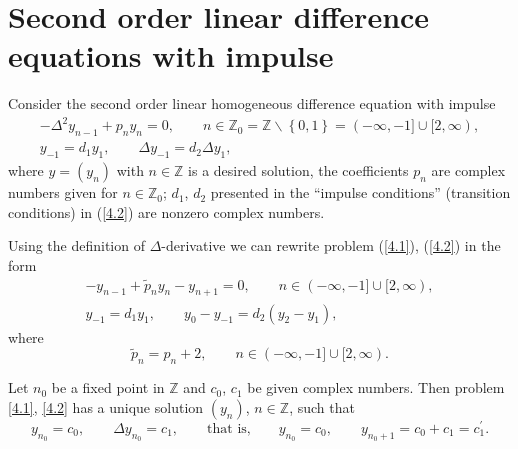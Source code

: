 \documentclass[pdftex]{sigma}
\numberwithin{equation}{section}
\begin{document}
\section[Second order linear difference equations with impulse]{Second order linear dif\/ference equations with impulse}\label{section4}

Consider the second order linear homogeneous dif\/ference equation with impulse%
\begin{gather}
-\Delta ^{2}y_{n-1}+p_{n}y_{n}=0,\qquad n\in \mathbb{Z}_{0}=%
\mathbb{Z}
\backslash \left\{ 0,1\right\} =(-\infty ,-1]\cup \lbrack 2,\infty ),
\label{4.1}
\\
y_{-1}=d_{1}y_{1},\qquad \Delta y_{-1}=d_{2}\Delta y_{1},  \label{4.2}
\end{gather}%
where $y=\left( y_{n}\right) $ with $n\in \mathbb{Z}
$ is a desired solution, the coef\/f\/icients $p_{n}$ are complex numbers given
for $n\in
\mathbb{Z}
_{0}$; $d_{1}$, $d_{2}$ presented in the ``impulse conditions'' (transition
conditions) in (\ref{4.2}) are nonzero complex numbers.

Using the def\/inition of $\Delta $-derivative we can rewrite problem (\ref{4.1}), (\ref{4.2}) in the form%
\begin{gather}
-y_{n-1}+\widetilde{p}_{n}y_{n}-y_{n+1}=0,\qquad n\in (-\infty ,-1]\cup
\lbrack 2,\infty ),  \label{4.3}
\\
y_{-1}=d_{1}y_{1},\qquad y_{0}-y_{-1}=d_{2}(y_{2}-y_{1}),  \label{4.4}
\end{gather}%
where%
\[
\widetilde{p}_{n}=p_{n}+2,\qquad n\in (-\infty ,-1]\cup \lbrack
2,\infty ).
\]

\begin{theorem}
\label{Th4.1}Let $n_{0}$ be a fixed point in $\mathbb{Z}$ and $c_{0}$, $c_{1}$ be given complex numbers. Then problem \eqref{4.1}, \eqref{4.2} has a unique solution $(y_{n})$, $n\in
\mathbb{Z}$, such that%
\begin{equation}
y_{n_{0}}=c_{0},\qquad \Delta y_{n_{0}}=c_{1},\qquad \text{that is,}\qquad
y_{n_{0}}=c_{0},\qquad y_{n_{0}+1}=c_{0}+c_{1}=c_{1}^{\prime }.
\label{4.5}
\end{equation}
\end{theorem}
\end{document}
